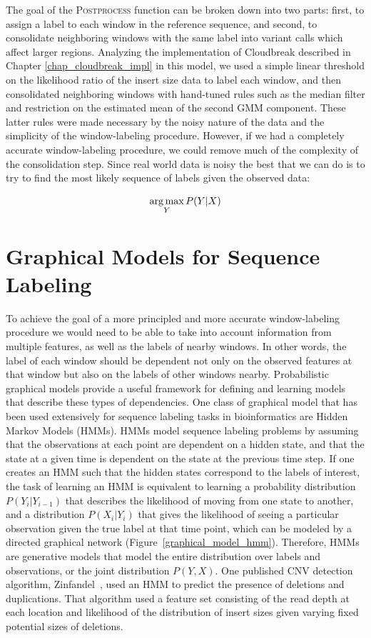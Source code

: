 The goal of the \textsc{Postprocess} function can be broken down into two parts: first, to assign a label to each window in the reference sequence, and second, to consolidate neighboring windows with the same label into variant calls which affect larger regions. Analyzing the implementation of Cloudbreak described in Chapter \ref{chap_cloudbreak_impl} in this model, we used a simple linear threshold on the likelihood ratio of the insert size data to label each window, and then consolidated neighboring windows with hand-tuned rules such as the median filter and restriction on the estimated mean of the second GMM component. These latter rules were made necessary by the noisy nature of the data and the simplicity of the window-labeling procedure. However, if we had a completely accurate window-labeling procedure, we could remove much of the complexity of the consolidation step. Since real world data is noisy the best that we can do is to try to find the most likely sequence of labels given the observed data:

\[ \operatorname*{arg\,max}_Y P(Y|X) \]


\section{Graphical Models for Sequence Labeling}

To achieve the goal of a more principled and more accurate window-labeling procedure we would need to be able to take into account information from multiple features, as well as the labels of nearby windows. In other words, the label of each window should be dependent not only on the observed features at that window but also on the labels of other windows nearby. Probabilistic graphical models provide a useful framework for defining and learning models that describe these types of dependencies. One class of graphical model that has been used extensively for sequence labeling tasks in bioinformatics are Hidden Markov Models (HMMs). HMMs model sequence labeling problems by assuming that the observations at each point are dependent on a hidden state, and that the state at a given time is dependent on the state at the previous time step. If one creates an HMM such that the hidden states correspond to the labels of interest, the task of learning an HMM is equivalent to learning a probability distribution $P(Y_i|Y_{i-1})$ that describes the likelihood of moving from one state to another, and a distribution $P(X_i|Y_i)$ that gives the likelihood of seeing a particular observation given the true label at that time point, which can be modeled by a directed graphical network (Figure~\ref{graphical_model_hmm}). Therefore, HMMs are generative models that model the entire distribution over labels and observations, or the joint distribution $P(Y,X)$. One published CNV detection algorithm, Zinfandel~\cite{Shen:2011ku}, used an HMM to predict the presence of deletions and duplications. That algorithm used a feature set consisting of the read depth at each location and likelihood of the distribution of insert sizes given varying fixed potential sizes of deletions.

